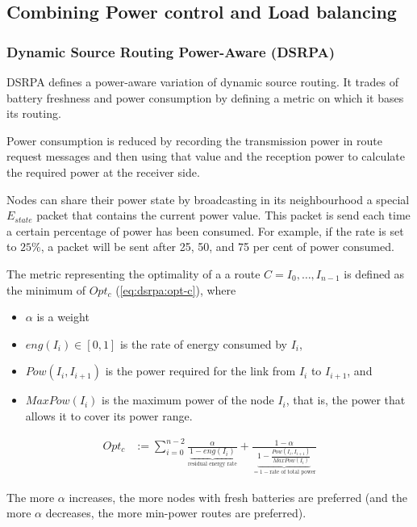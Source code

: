 \subsection{Combining Power control and Load balancing}
\subsubsection{Dynamic Source Routing Power-Aware (DSRPA)}
DSRPA\cite{djenouri2006new} defines a power-aware variation of dynamic source
routing. It trades of battery freshness and power consumption by defining a
metric on which it bases its routing.

Power consumption is reduced by recording the transmission power in route
request messages and then using that value and the reception power to calculate
the required power at the receiver side.

Nodes can share their power state by broadcasting in its neighbourhood a special
$E_{state}$ packet that contains the current power value. This packet is send
each time a certain percentage of power has been consumed. For example, if the
rate is set to $25\%$, a packet will be sent after 25, 50, and 75 per cent of
power consumed.

The metric representing the optimality of a a route $C=I_{0}, \ldots, I_{n-1}$
is defined as the minimum of $Opt_{c}$ (\ref{eq:dsrpa:opt-c}), where
\begin{itemize}
    \item $\alpha$ is a weight
    \item $eng(I_{i}) \in [0,1]$ is the rate of energy consumed by $I_{i}$,
    \item $Pow(I_{i}, I_{i+1})$ is the power required for the link from $I_{i}$ to $I_{i+1}$, and
    \item $MaxPow(I_{i})$ is the maximum power of the node $I_{i}$, that is, the power that allows
          it to cover its power range.
\end{itemize}

\begin{align}
Opt_{c} &:= \sum_{i=0}^{n-2} \frac{\alpha}{\underbrace{1-eng(I_{i})}_{\text{residual energy rate}}} + \frac{1-\alpha}{\underbrace{1-\frac{Pow(I_{i}, I_{i+1})}{MaxPow(I_{i})}}_{= 1 - \text{rate of total power}}}
\label{eq:dsrpa:opt-c}
\end{align} 


The more $\alpha$ increases, the more nodes with fresh batteries are preferred
(and the more $\alpha$ decreases, the more min-power routes are preferred).

